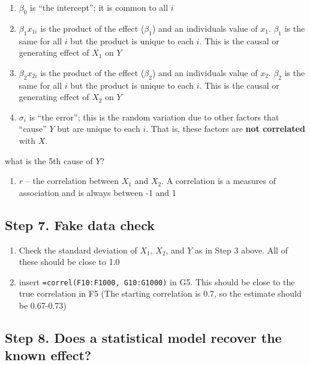 \documentclass[]{book}
\providecommand{\tightlist}{%
  \setlength{\itemsep}{0pt}\setlength{\parskip}{0pt}}
\begin{document}
\begin{enumerate}
\def\labelenumi{\arabic{enumi}.}
\tightlist
\item
  \(\beta_0\) is ``the intercept''; it is common to all \(i\)
\item
  \(\beta_1 x_{1i}\) is the product of the effect (\(\beta_1\)) and an
  individuals value of \(x_1\). \(\beta_1\) is the same for all \(i\)
  but the product is unique to each \(i\). This is the causal or
  generating effect of \(X_1\) on \(Y\)
\item
  \(\beta_2 x_{2i}\) is the product of the effect (\(\beta_2\)) and an
  individuals value of \(x_2\). \(\beta_2\) is the same for all \(i\)
  but the product is unique to each \(i\). This is the causal or
  generating effect of \(X_2\) on \(Y\)
\item
  \(\sigma_i\) is ``the error''; this is the random variation due to
  other factors that ``cause'' \(Y\) but are unique to each \(i\). That
  is, these factors are \textbf{not correlated} with \(X\).
\end{enumerate}

what is the 5th cause of \(Y\)?

\begin{enumerate}
\def\labelenumi{\arabic{enumi}.}
\setcounter{enumi}{4}
\tightlist
\item
  \(r\) -- the correlation between \(X_1\) and \(X_2\). A correlation is
  a measures of association and is always between -1 and 1
\end{enumerate}

\subsection{Step 7. Fake data check}\label{step-7.-fake-data-check}

\begin{enumerate}
\def\labelenumi{\arabic{enumi}.}
\tightlist
\item
  Check the standard deviation of \(X_1\), \(X_2\), and \(Y\) as in Step
  3 above. All of these should be close to 1.0
\item
  insert \texttt{=correl(F10:F1000,\ G10:G1000)} in G5. This should be
  close to the true correlation in F5 (The starting correlation is 0.7,
  so the estimate should be 0.67-0.73)
\end{enumerate}

\subsection{Step 8. Does a statistical model recover the known
effect?}\label{step-8.-does-a-statistical-model-recover-the-known-effect}
\end{document}

